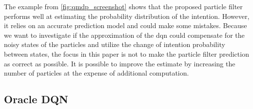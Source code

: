 The example from \ref{fig:qmdp_screenshot} shows that the proposed particle filter performs well at estimating the probability distribution of the intention. However, it relies on an accurate prediction model and could make some mistakes. 
Because we want to investigate if the approximation of the \gls{dqn} could compensate for the noisy states of the particles and utilize the change of intention probability between states, the focus in this paper is not to make the particle filter prediction as correct as possible. 
It is possible to improve the estimate by increasing the number of particles at the expense of additional computation. 

\subsection{Oracle DQN}
